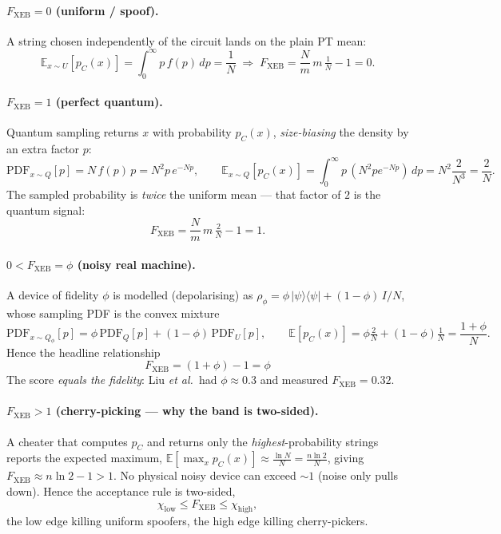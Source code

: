 \documentclass[11pt]{article}
\theoremstyle{definition}
\theoremstyle{plain}
\newcommand{\Fxeb}{F_{\mathrm{XEB}}}
\newcommand{\E}{\mathbb{E}}
\begin{document}
\paragraph{$\Fxeb=0$ (uniform / spoof).} A string chosen independently of the circuit lands
on the plain PT mean:
\[
\E_{x\sim U}[p_C(x)] = \int_0^\infty p\,f(p)\,dp = \frac1N
\;\Longrightarrow\;
\Fxeb=\frac{N}{m}\,m\,\tfrac1N - 1 = 0 .
\]

\paragraph{$\Fxeb=1$ (perfect quantum).} Quantum sampling returns $x$ with probability
$p_C(x)$, \emph{size-biasing} the density by an extra factor $p$:
\[
\mathrm{PDF}_{x\sim Q}[p]=N\,f(p)\,p = N^2 p\,e^{-Np},\qquad
\E_{x\sim Q}[p_C(x)] = \int_0^\infty p\,(N^2 p e^{-Np})\,dp = N^2\frac{2}{N^3}=\frac2N .
\]
The sampled probability is \emph{twice} the uniform mean --- that factor of $2$ is the
quantum signal:
\[
\Fxeb=\frac{N}{m}\,m\,\tfrac2N - 1 = 1 .
\]

\paragraph{$0<\Fxeb=\phi$ (noisy real machine).} A device of fidelity $\phi$ is modelled
(depolarising) as $\rho_\phi=\phi\,|\psi\rangle\langle\psi|+(1-\phi)\,I/N$, whose sampling
PDF is the convex mixture
\[
\mathrm{PDF}_{x\sim Q_\phi}[p]=\phi\,\mathrm{PDF}_Q[p]+(1-\phi)\,\mathrm{PDF}_U[p],
\qquad
\E[p_C(x)]=\phi\tfrac2N+(1-\phi)\tfrac1N=\frac{1+\phi}{N}.
\]
Hence the headline relationship
\begin{equation}\label{eq:fxebphi}
\boxed{\;\Fxeb = (1+\phi)-1 = \phi\;}
\end{equation}
The score \emph{equals the fidelity}: Liu \emph{et al.}\ had $\phi\approx0.3$ and measured
$\Fxeb=0.32$.

\paragraph{$\Fxeb>1$ (cherry-picking --- why the band is two-sided).} A cheater that computes
$p_C$ and returns only the \emph{highest}-probability strings reports the expected maximum,
$\E[\max_x p_C(x)]\approx \tfrac{\ln N}{N}=\tfrac{n\ln2}{N}$, giving
$\Fxeb\approx n\ln2-1>1$. No physical noisy device can exceed $\sim1$ (noise only pulls
down). Hence the acceptance rule is two-sided,
\[
\chi_{\text{low}} \le \Fxeb \le \chi_{\text{high}},
\]
the low edge killing uniform spoofers, the high edge killing cherry-pickers.
\end{document}
